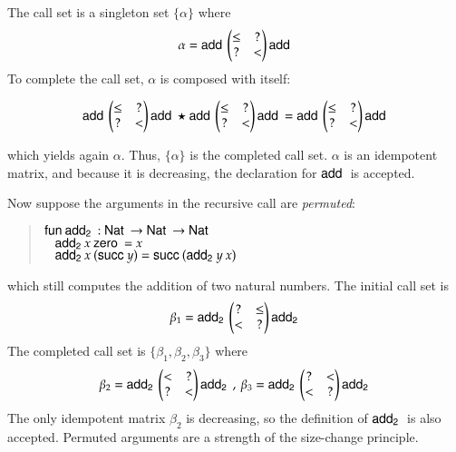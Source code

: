 \noindent The call set is a singleton set $\{ \alpha \}$ where
\[
\alpha = 
\mathsf{add}\:\begin{pmatrix}
\leq & ? \\
?    & < \\
\end{pmatrix}\mathsf{add}\:
\]
\noindent To complete the call set, $\alpha$ is composed with itself:

\[
\mathsf{add}\:\begin{pmatrix}
\leq & ? \\
?    & < \\
\end{pmatrix}\mathsf{add}\:
\star
\mathsf{add}\:\begin{pmatrix}
\leq & ? \\
?    & < \\
\end{pmatrix}\mathsf{add}\:
=
\mathsf{add}\:\begin{pmatrix}
\leq & ? \\
?    & < \\
\end{pmatrix}\mathsf{add}\:
\]

\noindent which yields again $\alpha$. 
Thus, $\{ \alpha \}$ is the completed call set.
$\alpha$ is an idempotent matrix, and because it is decreasing, the declaration for $\mathsf{add}\:$ is accepted.

\noindent Now suppose the arguments in the recursive call are \emph{permuted}:
\begin{quote}
$\mathsf{fun}\: \mathsf{add_2}\: : \mathsf{Nat}\: \rightarrow \mathsf{Nat}\: \rightarrow \mathsf{Nat}\:$\\
$\hspace*{3mm} \mathsf{add_2}\: x \: \mathsf{zero}\: = x $\\
$\hspace*{3mm} \mathsf{add_2}\: x \: (\mathsf{succ}\: y) = \mathsf{succ}\: (\mathsf{add_2}\: y \: x)  $
\end{quote}
which still computes the addition of two natural numbers.
\noindent The initial call set is  
\[
\beta_1 = \mathsf{add_2}\:\begin{pmatrix}
? & \leq \\
< & ?   \\
\end{pmatrix}\mathsf{add_2}\:
\]
The completed call set is $\{\beta_1,\beta_2,\beta_3\}$ where 
\[
\beta_2 = \mathsf{add_2}\: \begin{pmatrix}
< & ?    \\
? & <    \\
\end{pmatrix} \mathsf{add_2}\:
\:,\:
\beta_3 = \mathsf{add_2}\: \begin{pmatrix}
? & <    \\
< & ?    \\
\end{pmatrix} \mathsf{add_2}\:
\] 
The only idempotent matrix $\beta_2$ is decreasing, so the definition of $\mathsf{add_2}\:$ is also accepted.
Permuted arguments are a strength of the size-change principle.


